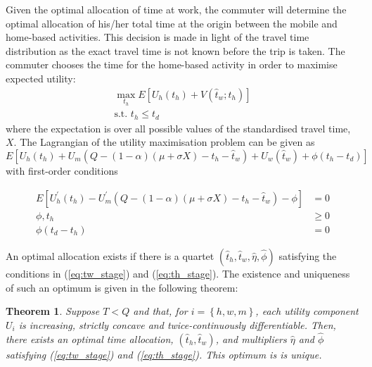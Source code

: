 \documentclass[12pt,a4paper,british]{article}
\newtheorem{theorem}{Theorem}[section]
\begin{document}
Given the optimal allocation of time at work, the commuter will determine the optimal allocation of his/her total time at the origin between the mobile and home-based activities. This decision is made in light of the travel time distribution as the exact travel time is not known before the trip is taken. The commuter chooses the time for the home-based activity in order to maximise expected utility:
\begin{gather*}
\max_{t_{h}}E\left[U_{h}\left(t_{h}\right)+V\left(\hat{t}_{w};t_{h}\right)\right]\\
\mbox{s.t. }t_{h}\leq t_{d}
\end{gather*}
where the expectation is over all possible values of the standardised travel time, $X$. The Lagrangian of the utility maximisation problem can be given as 
\begin{equation*}
E\left[U_{h}\left(t_{h}\right)+U_{m}\left(Q-\left(1-\alpha\right)\left(\mu+\sigma X\right)-t_{h}-\hat{t}_{w}\right)+U_{w}\left(\hat{t}_{w}\right)+\phi\left(t_{h}-t_{d}\right)\right]
\end{equation*}
with first-order conditions

\begin{subequations}\label{eq:th_stage}
\begin{align}
E\left[U_{h}^{\prime}\left(t_{h}\right)-U_{m}^{\prime}\left(Q-\left(1-\alpha\right)\left(\mu+\sigma X\right)-t_{h}-\hat{t}_{w}\right)-\phi\right] & =0\label{eq:stage1_wrt_th}\\
\phi,t_{h} & \geq0\label{eq:stage1_lambda}\\
\phi\left(t_{d}-t_{h}\right) & =0\label{eq:stage1_lambdai_const}
\end{align}
\end{subequations}

An optimal allocation exists if there is a quartet $\left(\hat{t}_{h},\hat{t}_{w},\hat{\eta},\hat{\phi}\right)$ satisfying the conditions in (\ref{eq:tw_stage}) and (\ref{eq:th_stage}). The existence and uniqueness of such an optimum is given in the following theorem:
\begin{theorem}
\label{thm:existence_stochastic}Suppose $T<Q$ and that, for $i=\left\{ h,w,m\right\} $, each utility component $U_{i}$ is increasing, strictly concave and twice-continuously differentiable. Then, there exists an optimal time allocation, $\left(\hat{t}_{h},\hat{t}_{w}\right)$, and multipliers $\hat{\eta}$ and $\hat{\phi}$ satisfying (\ref{eq:tw_stage}) and (\ref{eq:th_stage}). This optimum is is unique.
\end{theorem}
\end{document}
